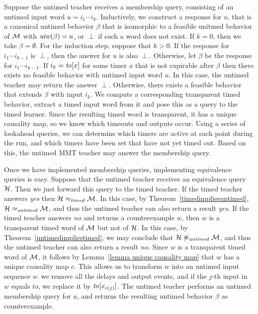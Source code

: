 Suppose the untimed teacher receives a membership query, consisting of an untimed input word
$u = i_1 \cdots i_k$.
Inductively, we construct a response for $u$, that is a canonical untimed behavior $\beta$ that is
isomorphic to a feasible unitmed behavior of ${\cal M}$ with $\mathit{uiw}(\beta) = u$,
or $\perp$ if such a word does not exist.
If $k=0$, then we take $\beta = \emptyset$.
For the induction step, suppose that $k>0$.
If the response for $i_1 \cdots i_{k-1}$ is $\perp$, then the answer for $u$ is also $\perp$.
Otherwise, let $\beta$ be the response for $i_1 \cdots i_{k-1}$.
If $i_k = \mathit{to}[x]$ for some timer $x$ that is not expirable after $\beta$ then there exists no feasible behavior
with untimed input word $u$. In this case, the untimed teacher may return the answer $\perp$.
Otherwise, there exists a feasible behavior that extends $\beta$ with input $i_k$. We compute
a corresponding transparent timed behavior, extract a timed input word from it and pose this as a query to the timed learner.
Since the resulting timed word is transparent, it has a unique causality map, so we know
which timeouts and outputs occur.
Using a series of lookahead queries, we can determine which timers are active at each point during the run,
and which timers have been set that have not yet timed out.
Based on this, the untimed MMT teacher may answer the membership query.

Once we have implemented membership queries, implementing equivalence queries is easy.
Suppose that the untimed teacher receives an equivalence query ${\cal H}$.
Then we just forward this query to the timed teacher.
If the timed teacher answers \emph{yes} then ${\cal H} \approx_{\mathit{timed}} {\cal M}$.
In this case, by Theorem~\ref{timedimpliesuntimed}, ${\cal H} \approx_{\mathit{untimed}} {\cal M}$,
and thus the untimed teacher can also return a result \emph{yes}.
If the timed teacher answers \emph{no} and returns a counterexample $w$,
then $w$ is a transparent timed word of ${\cal M}$ but not of ${\cal H}$.
In this case, by Theorem~\ref{untimedimpliestimed}, we may conclude that
${\cal H} \not\approx_{\mathit{untimed}} {\cal M}$, and thus the untimed teacher can also return a result \emph{no}.
Since $w$ is a transparent timed word of ${\cal M}$, it 
\iflong
follows by Lemma~\ref{lemma unique causality map} that $w$ 
\fi
has a unique causality map $c$.
This allows us to transform $w$ into an untimed input sequence $u$: 
we remove all the delays and output events, and if the $j$-th
input in $w$ equals $\mathit{to}$, we replace it by $\mathit{to}[x_{c(j)}]$.
The untimed teacher performs an untimed membership query for $u$, and returns the resulting 
untimed behavior $\beta$ as counterexample.






